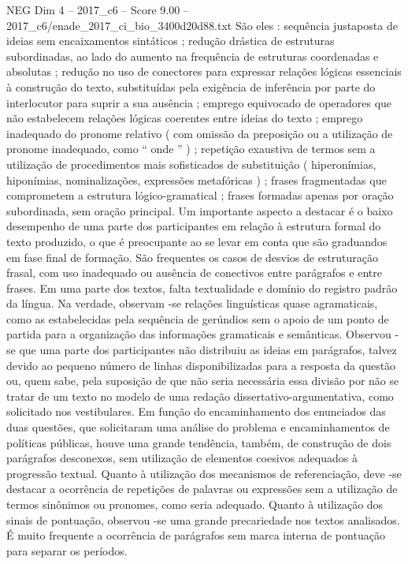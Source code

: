 \begin{textsample}{NEG Dim 4 – 2017\_c6 – Score 9.00 – 2017\_c6/enade\_2017\_ci\_bio\_3400d20d88.txt}
São eles : sequência justaposta de ideias sem encaixamentos sintáticos ; redução drástica de estruturas subordinadas, ao lado do aumento na frequência de estruturas coordenadas e absolutas ; redução no uso de conectores para expressar relações lógicas essenciais à construção do texto, substituídas pela exigência de inferência por parte do interlocutor para suprir a sua ausência ; emprego equivocado de operadores que não estabelecem relações lógicas coerentes entre ideias do texto ; emprego inadequado do pronome relativo ( com omissão da preposição ou a utilização de pronome inadequado, como “ onde ” ) ; repetição exaustiva de termos sem a utilização de procedimentos mais sofisticados de substituição ( hiperonímias, hiponímias, nominalizações, expressões metafóricas ) ; frases fragmentadas que comprometem a estrutura lógico-gramatical ; frases formadas apenas por oração subordinada, sem oração principal.
Um importante aspecto a destacar é o baixo desempenho de uma parte dos participantes em relação à estrutura formal do texto produzido, o que é preocupante ao se levar em conta que são graduandos em fase final de formação.
São frequentes os casos de desvios de estruturação frasal, com uso inadequado ou ausência de conectivos entre parágrafos e entre frases.
Em uma parte dos textos, falta textualidade e domínio do registro padrão da língua.
Na verdade, observam -se relações linguísticas quase agramaticais, como as estabelecidas pela sequência de gerúndios sem o apoio de um ponto de partida para a organização das informações gramaticais e semânticas.
Observou -se que uma parte dos participantes não distribuiu as ideias em parágrafos, talvez devido ao pequeno número de linhas disponibilizadas para a resposta da questão ou, quem sabe, pela suposição de que não seria necessária essa divisão por não se tratar de um texto no modelo de uma redação dissertativo-argumentativa, como solicitado nos vestibulares.
Em função do encaminhamento dos enunciados das duas questões, que solicitaram uma análise do problema e encaminhamentos de políticas públicas, houve uma grande tendência, também, de construção de dois parágrafos desconexos, sem utilização de elementos coesivos adequados à progressão textual.
Quanto à utilização dos mecanismos de referenciação, deve -se destacar a ocorrência de repetições de palavras ou expressões sem a utilização de termos sinônimos ou pronomes, como seria adequado.
Quanto à utilização dos sinais de pontuação, observou -se uma grande precariedade nos textos analisados.
É muito frequente a ocorrência de parágrafos sem marca interna de pontuação para separar os períodos.

\end{textsample}
